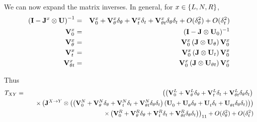 \documentclass{article}
\begin{document}
We can now expand the matrix inverses.
In general, for $x \in \{ L, N, R \}$,
\begin{eqnarray*}
  \left( {\bf I} - {\bf J}^x \otimes {\bf U} \right)^{-1}
  & = & {\bf V}_0^{x} + {\bf V}_\theta^{x} \delta_\theta + {\bf V}_t^{x} \delta_t + {\bf V}_{\theta t}^{x} \delta_\theta \delta_t + O(\delta_\theta^2) + O(\delta_t^2) \\
{\bf V}^x_0 & = & ({\bf I} - {\bf J} \otimes {\bf U}_0)^{-1} \\
{\bf V}^x_\theta & = & {\bf V}^x_0 \left( {\bf J} \otimes {\bf U}_\theta \right) {\bf V}^x_0 \\
{\bf V}^x_t & = & {\bf V}^x_0 \left( {\bf J} \otimes {\bf U}_t \right) {\bf V}^x_0 \\
{\bf V}^x_{\theta t} & = & {\bf V}^x_0 \left( {\bf J} \otimes {\bf U}_{\theta t} \right) {\bf V}^x_0
\end{eqnarray*}

Thus
\begin{eqnarray*}
T_{XY} & = &
\left(
\left( {\bf V}_0^{L} + {\bf V}_\theta^{L} \delta_\theta + {\bf V}_t^{L} \delta_t + {\bf V}_{\theta t}^{L} \delta_\theta \delta_t \right)
\right. \\ & & \quad \times
\left(
     {\bf J}^{X \to Y} \otimes
     \left( \left( {\bf V}_0^{N} + {\bf V}_\theta^{N} \delta_\theta + {\bf V}_t^{N} \delta_t + {\bf V}_{\theta t}^{N} \delta_\theta \delta_t \right)
     \left( {\bf U}_0^{} + {\bf U}_\theta^{} \delta_\theta + {\bf U}_t^{} \delta_t + {\bf U}_{\theta t}^{} \delta_\theta \delta_t \right) \right)
\right)
 \\ & & \quad \left. \times
 \left( {\bf V}_0^{R} + {\bf V}_\theta^{R} \delta_\theta + {\bf V}_t^{R} \delta_t + {\bf V}_{\theta t}^{R} \delta_\theta \delta_t \right)
\right)_{11}  + O(\delta_\theta^2) + O(\delta_t^2)
\end{eqnarray*}
\end{document}
